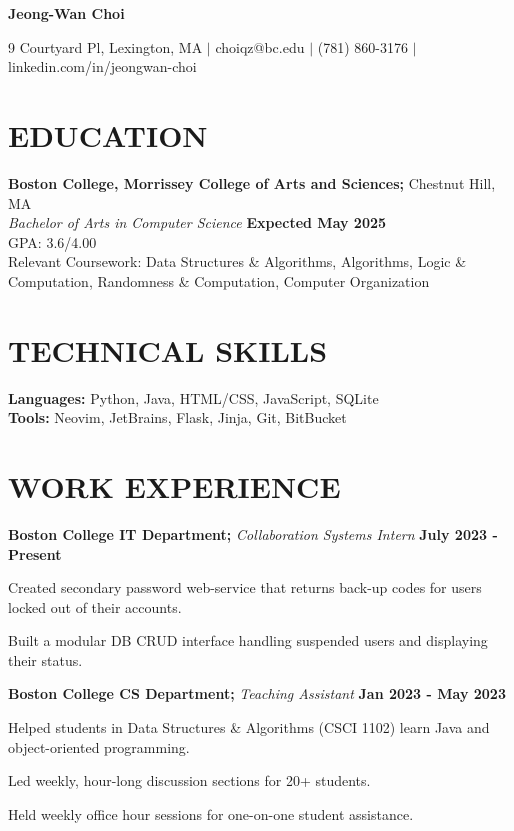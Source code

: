 \documentclass[11pt]{article}
\begin{document}
\begin{center}
\textbf{\LARGE Jeong-Wan Choi}
\end{center}

\begin{center}
9 Courtyard Pl, Lexington, MA $|$ choiqz@bc.edu $|$ (781) 860-3176 $|$ linkedin.com/in/jeongwan-choi 
\end{center}

\section*{EDUCATION}
\textbf{Boston College, Morrissey College of Arts and Sciences;} Chestnut Hill, MA \\
\textit{Bachelor of Arts in Computer Science} \hfill \textbf{Expected May 2025} \\
GPA: 3.6/4.00 \\
Relevant Coursework: Data Structures \& Algorithms, Algorithms, Logic \& Computation, Randomness \& Computation, Computer Organization

\section*{TECHNICAL SKILLS}
\textbf{Languages:} Python, Java, HTML/CSS, JavaScript, SQLite \\
\textbf{Tools:} Neovim, JetBrains, Flask, Jinja, Git, BitBucket 

\section*{WORK EXPERIENCE}
\textbf{Boston College IT Department;} \textit{Collaboration Systems Intern} \hfill \textbf{July 2023 - Present}
\begin{sublist}
	\item Created secondary password web-service that returns back-up codes for users locked out of their accounts. 
	\item Built a modular DB CRUD interface handling suspended users and displaying their status.
\end{sublist}

\raggedright
\textbf{Boston College CS Department;} \textit{Teaching Assistant} \hfill \textbf{Jan 2023 - May 2023}
\begin{sublist}
	\item Helped students in Data Structures \& Algorithms (CSCI 1102) learn Java and object-oriented programming. 
	\item Led weekly, hour-long discussion sections for 20+ students. 
	\item Held weekly office hour sessions for one-on-one student assistance.
\end{sublist}
\end{document}
